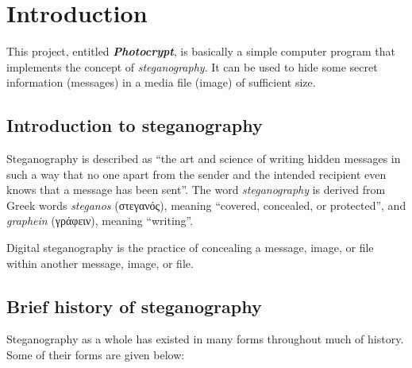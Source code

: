 \section{Introduction}

This project, entitled \emph{\textbf{Photocrypt}}, is basically a simple
computer program that implements the concept of \emph{steganography}. It can
be used to hide some secret information (messages) in a media file (image)
of sufficient size.

\subsection{Introduction to steganography}

Steganography is described as ``the art and science of writing hidden messages
in such a way that no one apart from the sender and the intended recipient
even knows that a message has been sent''. The word \emph{steganography} is
derived from Greek words \emph{steganos} (στεγανός), meaning ``covered,
concealed, or protected'', and \emph{graphein} (γράφειν), meaning ``writing''.

Digital steganography is the practice of concealing a message, image, or file
within another message, image, or file.

\subsection{Brief history of steganography}

Steganography as a whole has existed in many forms throughout much of history.
Some of their forms are given below:

